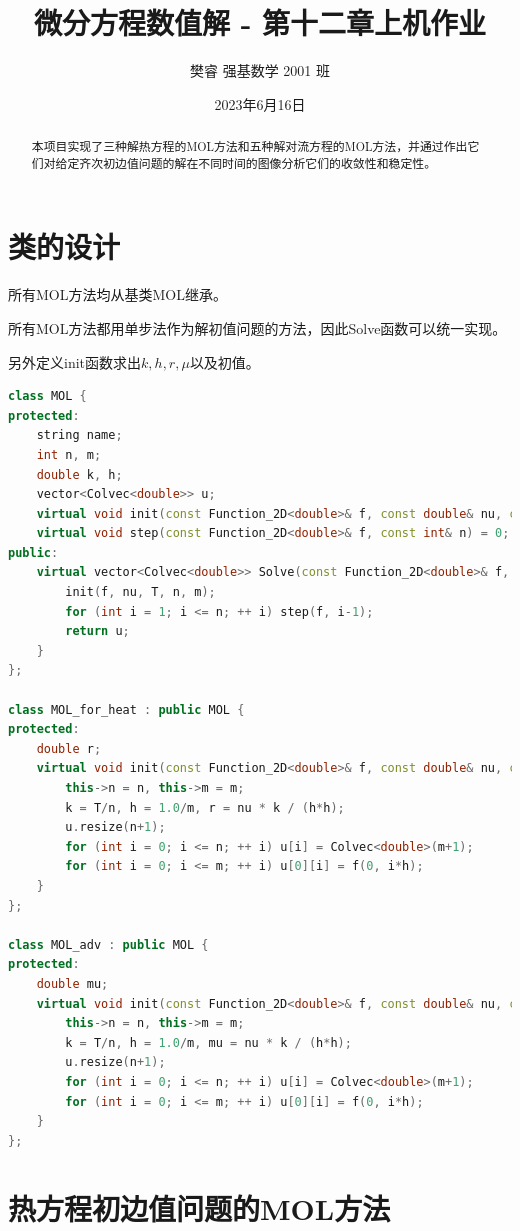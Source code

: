 \documentclass{ctexart}
\title{微分方程数值解 - 第十二章上机作业}
\author{樊睿 强基数学 2001 班}
\date{2023年6月16日}
\begin{document}
\maketitle

\begin{abstract}
	本项目实现了三种解热方程的MOL方法和五种解对流方程的MOL方法，并通过作出它们对给定齐次初边值问题的解在不同时间的图像分析它们的收敛性和稳定性。
\end{abstract}

\section{类的设计}
所有MOL方法均从基类MOL继承。

所有MOL方法都用单步法作为解初值问题的方法，因此Solve函数可以统一实现。

另外定义init函数求出$k,h,r,\mu$以及初值。

\begin{lstlisting}[language=c++]
class MOL {
protected:
	string name;
	int n, m;
	double k, h;
	vector<Colvec<double>> u;
	virtual void init(const Function_2D<double>& f, const double& nu, const double& T, const int& n, const int& m) = 0;
	virtual void step(const Function_2D<double>& f, const int& n) = 0;
public:
	virtual vector<Colvec<double>> Solve(const Function_2D<double>& f, const double& nu, const double& T, const int& n, const int& m) {
		init(f, nu, T, n, m);
		for (int i = 1; i <= n; ++ i) step(f, i-1);
		return u;
	}
};

class MOL_for_heat : public MOL {
protected:
	double r;
	virtual void init(const Function_2D<double>& f, const double& nu, const double& T, const int& n, const int& m) {
		this->n = n, this->m = m;
		k = T/n, h = 1.0/m, r = nu * k / (h*h);
		u.resize(n+1);
		for (int i = 0; i <= n; ++ i) u[i] = Colvec<double>(m+1);
		for (int i = 0; i <= m; ++ i) u[0][i] = f(0, i*h);
	}
};

class MOL_adv : public MOL {
protected:
	double mu;
	virtual void init(const Function_2D<double>& f, const double& nu, const double& T, const int& n, const int& m) {
		this->n = n, this->m = m;
		k = T/n, h = 1.0/m, mu = nu * k / (h*h);
		u.resize(n+1);
		for (int i = 0; i <= n; ++ i) u[i] = Colvec<double>(m+1);
		for (int i = 0; i <= m; ++ i) u[0][i] = f(0, i*h);
	}
};
\end{lstlisting}

\section{热方程初边值问题的MOL方法}
\end{document}
